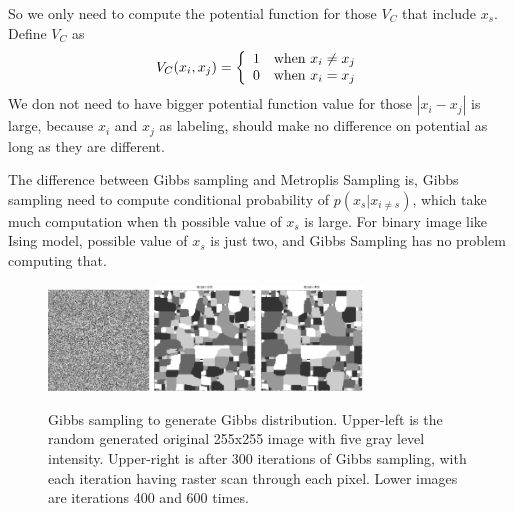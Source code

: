 \documentclass[12pt]{article}
\begin{document}
So we only need to compute the potential function for those $V_C$ that include $x_s$. Define $V_C$ as 
\begin{equation}
V_C(x_i, x_j) = \left \{
\begin{array}{l l}
1 \quad \mbox{when } x_i \neq x_j\\
0 \quad \mbox{when } x_i = x_j\\
\end{array} \right .
\end{equation}
We don not need to have bigger potential function value for those $|x_i - x_j|$ is large, because $x_i$ and $x_j$ as labeling, should make no difference on potential as long as they are different.

The difference between Gibbs sampling and Metroplis Sampling is, Gibbs sampling need to compute conditional probability of $p(x_s | x_{i\neq s})$, which take much computation when th possible value of $x_s$ is large. For binary image like Ising model, possible value of $x_s$ is just two, and Gibbs Sampling has no problem computing that.

\begin{figure}
\centering
\includegraphics[width = 0.24\textwidth]{figures/Gibbs01.eps} 
\includegraphics[width = 0.24\textwidth]{figures/Gibbs200.eps} 
\includegraphics[width = 0.24\textwidth]{figures/Gibbs400.eps} 
\caption{Gibbs sampling to generate Gibbs distribution. Upper-left is the random generated  original 255x255 image with five gray level intensity. Upper-right is after 300 iterations of Gibbs sampling, with each iteration having raster scan through each pixel. Lower images are iterations 400 and 600 times.}
\label{Gibbs01}
\end{figure}
\end{document}
